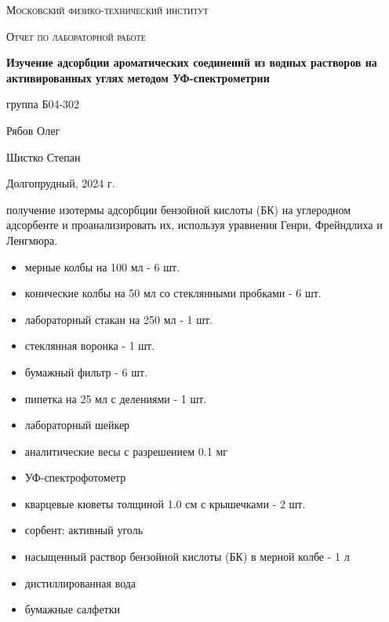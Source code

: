 \documentclass[a4paper]{article}
\begin{document}
\begin{titlepage}
	\centering
	\vspace{5cm}
	{\scshape\LARGE Московский физико-технический институт \par}
	\vspace{4cm}
	{\scshape\Large Отчет по лабораторной работе} \\
	\vspace{1cm}
	{\huge\bfseries Изучение адсорбции ароматических соединений из водных растворов на активированных углях методом УФ-спектрометрии \par}
	\vspace{1cm}
	\vfill
\begin{flushright}
	{\large группа Б04-302}\par
	\vspace{0.3cm}
	{\LARGE Рябов Олег} \par
		\vspace{0.3cm}
	{\LARGE Шистко Степан} \par
\end{flushright}
	

	\vfill

	Долгопрудный, 2024 г.
\end{titlepage}

	\thispagestyle{empty}


	\newpage \LARGE
	
		\tableofcontents %
	
	\newpage
\par
	\large \textbf{} получение изотермы адсорбции бензойной кислоты (БК) на углеродном адсорбенте и проанализировать их, используя уравнения Генри, Фрейндлиха и Ленгмюра.
	\par \vspace{0.3 cm}
	\textbf{}
        \begin{itemize}
           \item мерные колбы на 100 мл - 6 шт.
           \item конические колбы на 50 мл со стеклянными пробками - 6 шт.
           \item лабораторный стакан на 250 мл - 1 шт.
           \item стеклянная воронка - 1 шт.
           \item бумажный фильтр - 6 шт.
           \item пипетка на 25 мл с делениями - 1 шт.
           \item лабораторный шейкер 
           \item аналитические весы с разрешением 0.1 мг
           \item УФ-спектрофотометр
           \item кварцевые кюветы толщиной 1.0 см с крышечками - 2 шт.
           \item сорбент: активный уголь
           \item насыщенный раствор бензойной кислоты (БК) в мерной колбе - 1 л
           \item дистиллированная вода
           \item бумажные салфетки
        \end{itemize}  
\vspace{0.3 cm}
\end{document}

